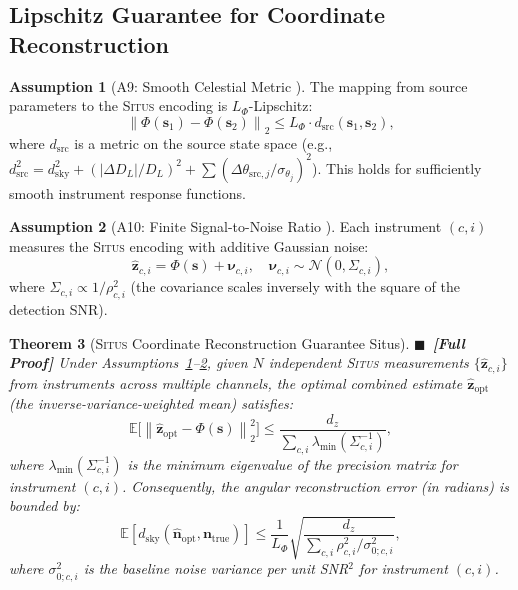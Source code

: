\documentclass[11pt,a4paper]{article}
\newtheorem{theorem}{Theorem}[section]
\theoremstyle{definition}
\newtheorem{assumption}[theorem]{Assumption}
\newcommand{\rigorFull}[0]{$\blacksquare$~\textbf{[Full Proof]}}
\newcommand{\Situs}{\textsc{Situs}}
\newcommand{\E}{\mathbb{E}}
\newcommand{\cN}{\mathcal{N}}
\newcommand{\norm}[1]{\left\lVert#1\right\rVert}
\begin{document}
\subsection{Lipschitz Guarantee for Coordinate Reconstruction}
\begin{assumption}[A9: Smooth Celestial Metric ]\label{ass:A9}
The mapping from source parameters to the \Situs{} encoding is $L_\Phi$-Lipschitz:
\begin{equation}\label{eq:lipschitz_situs}
\norm{\Phi(\mathbf{s}_1) - \Phi(\mathbf{s}_2)}_2 \leq L_\Phi \cdot d_{\mathrm{src}}(\mathbf{s}_1, \mathbf{s}_2),
\end{equation}
where $d_{\mathrm{src}}$ is a metric on the source state space (e.g., $d_{\mathrm{src}}^2 = d_{\mathrm{sky}}^2 + (|\Delta D_L|/D_L)^2 + \sum (\Delta \theta_{\mathrm{src},j}/\sigma_{\theta_j})^2$). This holds for sufficiently smooth instrument response functions.
\end{assumption}
\begin{assumption}[A10: Finite Signal-to-Noise Ratio ]\label{ass:A10}
Each instrument $(c,i)$ measures the \Situs{} encoding with additive Gaussian noise:
\begin{equation}\label{eq:noisy_situs}
\hat{\mathbf{z}}_{c,i} = \Phi(\mathbf{s}) + \boldsymbol{\nu}_{c,i}, \quad \boldsymbol{\nu}_{c,i} \sim \cN(0, \Sigma_{c,i}),
\end{equation}
where $\Sigma_{c,i} \propto 1/\rho_{c,i}^2$ (the covariance scales inversely with the square of the detection SNR).
\end{assumption}
\begin{theorem}[\Situs{} Coordinate Reconstruction Guarantee Situs]\label{thm:situs_reconstruction}
\rigorFull
Under Assumptions~\ref{ass:A9}--\ref{ass:A10}, given $N$ independent \Situs{} measurements $\{\hat{\mathbf{z}}_{c,i}\}$ from instruments across multiple channels, the optimal combined estimate $\hat{\mathbf{z}}_{\mathrm{opt}}$ (the inverse-variance-weighted mean) satisfies:
\begin{equation}\label{eq:situs_bound}
\E\bigl[\norm{\hat{\mathbf{z}}_{\mathrm{opt}} - \Phi(\mathbf{s})}_2^2\bigr] \leq \frac{d_z}{\sum_{c,i} \lambda_{\min}(\Sigma_{c,i}^{-1})},
\end{equation}
where $\lambda_{\min}(\Sigma_{c,i}^{-1})$ is the minimum eigenvalue of the precision matrix for instrument $(c,i)$. Consequently, the angular reconstruction error (in radians) is bounded by:
\begin{equation}\label{eq:angular_bound}
\E[d_{\mathrm{sky}}(\hat{\mathbf{n}}_{\mathrm{opt}}, \mathbf{n}_{\mathrm{true}})] \leq \frac{1}{L_\Phi} \sqrt{\frac{d_z}{\sum_{c,i} \rho_{c,i}^2 / \sigma_{0; c,i}^2}},
\end{equation}
where $\sigma_{0; c,i}^2$ is the baseline noise variance per unit SNR$^2$ for instrument $(c,i)$.
\end{theorem}
\end{document}

